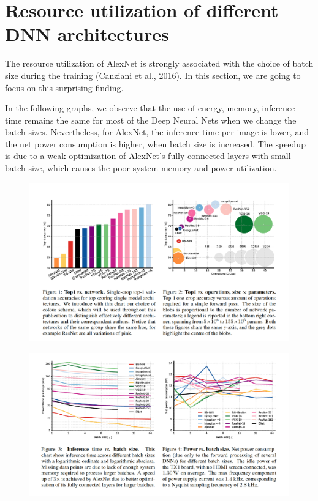 \section{Resource utilization of different DNN architectures}
The resource utilization of AlexNet is strongly associated with the choice of batch size during the training (\href{https://arxiv.org/abs/1605.07678}Canziani et al., 2016). In this section, we are going to focus on this surprising finding. 

In the following graphs, we observe that the use of energy, memory, inference time remains the same for most of the Deep Neural Nets when we change the batch sizes. Nevertheless, for AlexNet, the inference time per image is lower, and the net power consumption is higher, when batch size is increased. The speedup is due to a weak optimization of AlexNet's fully connected layers with small batch size, which causes the poor system memory and power utilization. 
\begin{figure}[!ht]
    \centering
    \includegraphics[scale=0.45]{figs/ic_01.png}
    \caption{}
    \label{01}
\end{figure}

\begin{figure}[!ht]
    \centering
    \includegraphics[scale=0.45]{figs/ic_02.png}
    \caption{}
    \label{02}
\end{figure}
\clearpage

